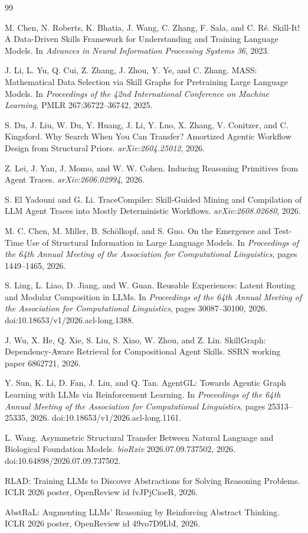 \begin{thebibliography}{99}

M. Chen, N. Roberts, K. Bhatia, J. Wang, C. Zhang, F. Sala, and C. R\'e. Skill-It! A Data-Driven Skills Framework for Understanding and Training Language Models. In \emph{Advances in Neural Information Processing Systems 36}, 2023.

J. Li, L. Yu, Q. Cui, Z. Zhang, J. Zhou, Y. Ye, and C. Zhang. MASS: Mathematical Data Selection via Skill Graphs for Pretraining Large Language Models. In \emph{Proceedings of the 42nd International Conference on Machine Learning}, PMLR 267:36722--36742, 2025.

S. Du, J. Liu, W. Du, Y. Huang, J. Li, Y. Luo, X. Zhang, V. Conitzer, and C. Kingsford. Why Search When You Can Transfer? Amortized Agentic Workflow Design from Structural Priors. \emph{arXiv:2604.25012}, 2026.

Z. Lei, J. Yan, J. Momo, and W. W. Cohen. Inducing Reasoning Primitives from Agent Traces. \emph{arXiv:2606.02994}, 2026.

S. El Yadouni and G. Li. TraceCompiler: Skill-Guided Mining and Compilation of LLM Agent Traces into Mostly Deterministic Workflows. \emph{arXiv:2608.02680}, 2026.

M. C. Chen, M. Miller, B. Sch\"olkopf, and S. Guo. On the Emergence and Test-Time Use of Structural Information in Large Language Models. In \emph{Proceedings of the 64th Annual Meeting of the Association for Computational Linguistics}, pages 1449--1465, 2026.

S. Ling, L. Liao, D. Jiang, and W. Guan. Reusable Experiences: Latent Routing and Modular Composition in LLMs. In \emph{Proceedings of the 64th Annual Meeting of the Association for Computational Linguistics}, pages 30087--30100, 2026. doi:10.18653/v1/2026.acl-long.1388.

J. Wu, X. He, Q. Xie, S. Liu, S. Xiao, W. Zhou, and Z. Lin. SkillGraph: Dependency-Aware Retrieval for Compositional Agent Skills. SSRN working paper 6862721, 2026.

Y. Sun, K. Li, D. Fan, J. Liu, and Q. Tan. AgentGL: Towards Agentic Graph Learning with LLMs via Reinforcement Learning. In \emph{Proceedings of the 64th Annual Meeting of the Association for Computational Linguistics}, pages 25313--25335, 2026. doi:10.18653/v1/2026.acl-long.1161.

L. Wang. Asymmetric Structural Transfer Between Natural Language and Biological Foundation Models. \emph{bioRxiv} 2026.07.09.737502, 2026. doi:10.64898/2026.07.09.737502.

RLAD: Training LLMs to Discover Abstractions for Solving Reasoning Problems. ICLR 2026 poster, OpenReview id fvJPjCioeR, 2026.

AbstRaL: Augmenting LLMs' Reasoning by Reinforcing Abstract Thinking. ICLR 2026 poster, OpenReview id 49vo7D9LbI, 2026.

\end{thebibliography}
